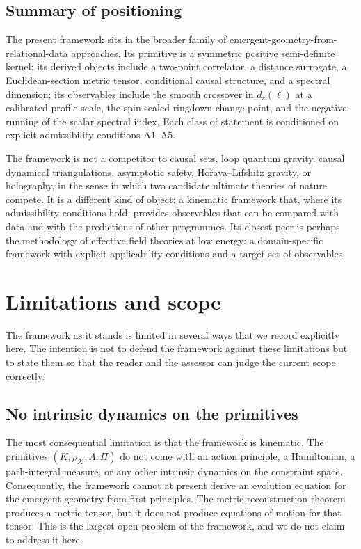 ﻿\documentclass[12pt,a4paper]{article}
\theoremstyle{definition}
\begin{document}
\subsection{Summary of positioning}
\label{sec:conn_summary}

The present framework sits in the broader family of emergent-geometry-from-relational-data approaches. Its primitive is a symmetric positive semi-definite kernel; its derived objects include a two-point correlator, a distance surrogate, a Euclidean-section metric tensor, conditional causal structure, and a spectral dimension; its observables include the smooth crossover in $d_s(\ell)$ at a calibrated profile scale, the spin-scaled ringdown change-point, and the negative running of the scalar spectral index. Each class of statement is conditioned on explicit admissibility conditions A1--A5.

The framework is not a competitor to causal sets, loop quantum gravity, causal dynamical triangulations, asymptotic safety, Ho\v{r}ava--Lifshitz gravity, or holography, in the sense in which two candidate ultimate theories of nature compete. It is a different kind of object: a kinematic framework that, where its admissibility conditions hold, provides observables that can be compared with data and with the predictions of other programmes. Its closest peer is perhaps the methodology of effective field theories at low energy: a domain-specific framework with explicit applicability conditions and a target set of observables.

\section{Limitations and scope}
\label{sec:limitations}

The framework as it stands is limited in several ways that we record explicitly here. The intention is not to defend the framework against these limitations but to state them so that the reader and the assessor can judge the current scope correctly.

\subsection{No intrinsic dynamics on the primitives}

The most consequential limitation is that the framework is kinematic. The primitives $(K,\rho_{\mathcal{K}},\Lambda,\Pi)$ do not come with an action principle, a Hamiltonian, a path-integral measure, or any other intrinsic dynamics on the constraint space. Consequently, the framework cannot at present derive an evolution equation for the emergent geometry from first principles. The metric reconstruction theorem produces a metric tensor, but it does not produce equations of motion for that tensor. This is the largest open problem of the framework, and we do not claim to address it here.
\end{document}
